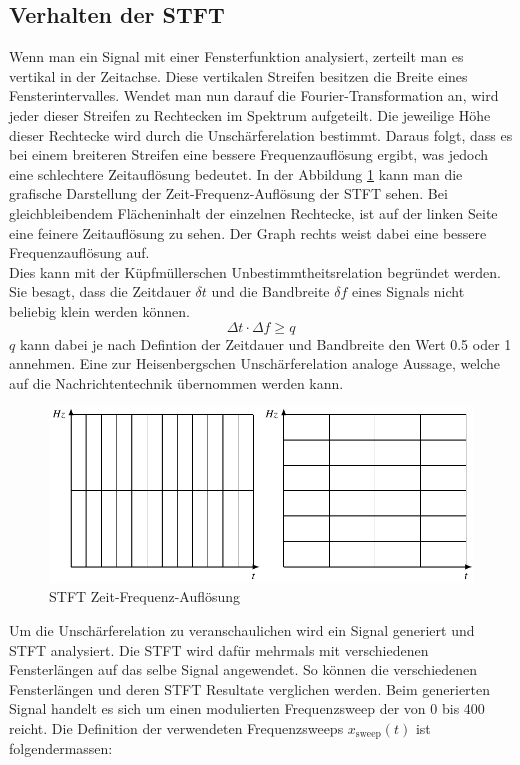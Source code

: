 \subsection{Verhalten der STFT}

Wenn man ein Signal mit einer Fensterfunktion analysiert, zerteilt man es vertikal in der Zeitachse. Diese vertikalen Streifen besitzen die Breite eines Fensterintervalles. Wendet man nun darauf die Fourier-Transformation an, wird jeder dieser Streifen zu Rechtecken im Spektrum aufgeteilt. Die jeweilige Höhe dieser Rechtecke wird durch die Unschärferelation bestimmt. Daraus folgt, dass es bei einem breiteren Streifen eine bessere Frequenzauflösung ergibt, was jedoch eine schlechtere Zeitauflösung bedeutet. In der Abbildung \ref{fig:stftauf} kann man die grafische Darstellung der Zeit-Frequenz-Auflösung der STFT sehen. Bei gleichbleibendem Flächeninhalt der einzelnen Rechtecke, ist auf der linken Seite eine feinere Zeitauflösung zu sehen. Der Graph rechts weist dabei eine bessere Frequenzauflösung auf. \\

Dies kann mit der Küpfmüllerschen Unbestimmtheitsrelation begründet werden. Sie besagt, dass die Zeitdauer $\delta t$ und die Bandbreite $\delta f$ eines Signals nicht beliebig klein werden können.  
\[\Delta t \cdot \Delta f \geq q\]
$q$ kann dabei je nach Defintion der Zeitdauer und Bandbreite den Wert 0.5 oder 1 annehmen. Eine zur Heisenbergschen Unschärferelation analoge Aussage, welche auf die Nachrichtentechnik übernommen werden kann.


\begin{figure}[!ht]
	\centering
	\includegraphics[width=0.7\linewidth]{papers/autotune/sections/fft/images/windows.pdf}
	\caption{STFT Zeit-Frequenz-Auflösung}\label{fig:stftauf}	
\end{figure}




Um die Unschärferelation zu veranschaulichen wird ein Signal generiert und STFT analysiert. Die STFT wird dafür mehrmals mit verschiedenen Fensterlängen auf das selbe Signal angewendet. So können die verschiedenen Fensterlängen und deren STFT Resultate verglichen werden. Beim generierten Signal handelt es sich um einen modulierten Frequenzsweep der von 0 bis 400\text{[Hz]} reicht. Die Definition der verwendeten Frequenzsweeps $x_{\text{sweep}}(t)$ ist folgendermassen:

